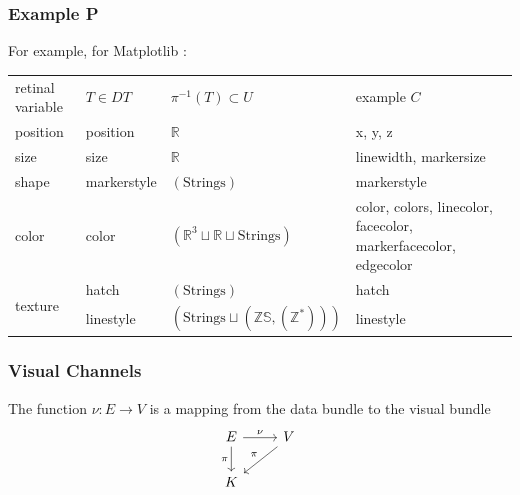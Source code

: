 \documentclass[../main.tex]{subfiles}
\begin{document}
\subsubsection {Example P}
For example, for Matplotlib \cite{hunterMatplotlib2DGraphics2007}:
\begin{table}[]
    \begin{tabular}{llll}
    retinal variable         & $T \in DT$  & $\pi^{-1}(T) \subset U$                                 & example $C$                                                     \\
    position                 & position    & $\mathbb{R}$                                              & x, y, z                                                         \\
    size                     & size        & $\mathbb{R}$                                              & linewidth, markersize                                            \\
    shape                    & markerstyle & $(\textrm{Strings})$                                      & markerstyle                                                     \\
    color                    & color       & $(\mathbb{R}^3 \sqcup \mathbb{R}\sqcup \textrm{Strings})$ & color, colors, linecolor, facecolor, markerfacecolor, edgecolor \\
    \multirow{2}{*}{texture} & hatch       & $(\textrm{Strings})$                                      & hatch                                                           \\
                             & linestyle   & $(\textrm{Strings}\sqcup(\mathbb{ZS}, (\mathbb{Z}^*)))$                           & linestyle                                                      
    \end{tabular}
\end{table}

\subsubsection{Visual Channels}
The function $\nu: E \rightarrow V$ is a mapping from the data bundle to the visual bundle 
\begin{equation}
    \begin{tikzcd}
        E \arrow[d, "\pi"'] \arrow[r, "\nu"] & V \arrow[ld, "\pi"'] \\
        K                                    &                     
        \end{tikzcd}
\end{equation}
\end{document}
